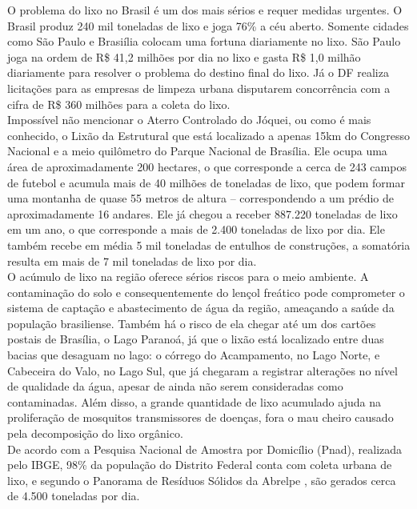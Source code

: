 O problema do lixo no Brasil é um dos mais sérios e requer medidas urgentes. O Brasil produz 240 mil toneladas de lixo e joga 76\% a céu aberto. Somente cidades como São Paulo e Brasiília colocam uma fortuna diariamente no lixo. São Paulo joga na ordem de R\$ 41,2 milhões por dia no lixo e gasta R\$ 1,0 milhão diariamente para resolver o problema do destino final do lixo. Já o DF realiza licitações para as empresas de limpeza urbana disputarem concorrência com a cifra de R\$ 360 milhões para a coleta do lixo. \\

Impossível não mencionar o Aterro Controlado do Jóquei, ou como é mais conhecido, o Lixão da Estrutural que está localizado a apenas 15km do Congresso Nacional e a meio quilômetro do Parque Nacional de Brasília. Ele ocupa uma área de aproximadamente 200 hectares, o que corresponde a cerca de 243 campos de futebol e acumula mais de 40 milhões de toneladas de lixo, que podem formar uma montanha de quase 55 metros de altura – correspondendo a um prédio de aproximadamente 16 andares. Ele já chegou a receber 887.220 toneladas de lixo em um ano, o que corresponde a mais de 2.400 toneladas de lixo por dia. Ele também recebe em média 5 mil toneladas de entulhos de construções, a somatória resulta em mais de 7 mil toneladas de lixo por dia.\\

O acúmulo de lixo na região oferece sérios riscos para o meio ambiente. A contaminação do solo e consequentemente do lençol freático pode comprometer o sistema de captação e abastecimento de água da região, ameaçando a saúde da população brasiliense. Também há o risco de ela chegar até um dos cartões postais de Brasília, o Lago Paranoá, já que o lixão está localizado entre duas bacias que desaguam no lago: o córrego do Acampamento, no Lago Norte, e Cabeceira do Valo, no Lago Sul, que já chegaram a registrar alterações no nível de qualidade da água, apesar de ainda não serem consideradas como contaminadas. Além disso, a grande quantidade de lixo acumulado ajuda na proliferação de mosquitos transmissores de doenças, fora o mau cheiro causado pela decomposição do lixo orgânico.\\

De acordo com a Pesquisa Nacional de Amostra por Domicílio (Pnad), realizada pelo IBGE, 98\% da população do Distrito Federal conta com coleta urbana de lixo, e segundo o Panorama de Resíduos Sólidos da Abrelpe , são gerados cerca de 4.500 toneladas por dia.\\

